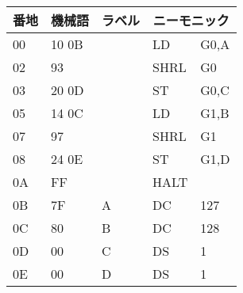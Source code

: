 \begin{description}
{\tt
\begin{tabular}{|l|l|l|l l|} \hline
番地 & 機械語 & ラベル & \multicolumn{2}{|c|}{ニーモニック} \\
\hline
00 & 10 0B &   & LD   & G0,A \\
02 & 93    &   & SHRL & G0   \\
03 & 20 0D &   & ST   & G0,C \\
05 & 14 0C &   & LD   & G1,B \\
07 & 97    &   & SHRL & G1   \\
08 & 24 0E &   & ST   & G1,D \\
0A & FF    &   & HALT &      \\
0B & 7F    & A & DC   & 127  \\
0C & 80    & B & DC   & 128  \\
0D & 00    & C & DS   & 1    \\
0E & 00    & D & DS   & 1    \\
\hline
\end{tabular}
}
\end{description}

